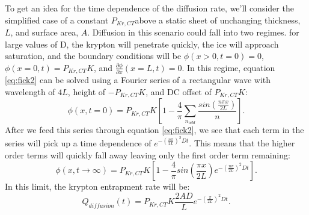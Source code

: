 To get an idea for the time dependence of the diffusion rate, we'll consider the simplified case of a constant $P_{Kr,CT}$above a static sheet of unchanging thickness, $L$, and surface area, $A$. Diffusion in this scenario could fall into two regimes. for large values of D, the krypton will penetrate quickly, the ice will approach saturation, and the boundary conditions will be $\phi(x>0,t=0)=0$, $\phi(x=0,t)=P_{Kr,CT}K$, and $\frac{\partial \phi}{\partial x} (x=L,t)=0$. In this regime, equation \ref{eq:fick2} can be solved using a Fourier series of a rectangular wave with wavelength of $4L$, height of $-P_{Kr,CT}K$, and DC offset of $P_{Kr,CT}K$:
\begin{equation}
\phi(x,t=0)=P_{Kr,CT}K[1-\frac{4}{\pi}\sum_{n_{odd}}\frac{sin(\frac{n\pi x}{2L})}{n}].
\end{equation}
After we feed this series through equation \ref{eq:fick2}, we see that each term in the series will pick up a time dependence of $e^{-(\frac{n\pi }{2L})^2D t}$. This means that the higher order terms will quickly fall away leaving only the first order term remaining:
\begin{equation}
\phi(x,t \rightarrow \infty)=P_{Kr,CT}K[1-\frac{4}{\pi}sin(\frac{\pi x}{2L})e^{-(\frac{n\pi }{2L})^2D t}].
\end{equation}
In this limit, the krypton entrapment rate will be:
\begin{equation}
Q_{diffusion}(t)=P_{Kr,CT}K\frac{2AD}{L}e^{-(\frac{\pi }{2L})^2D t}.
\end{equation}

